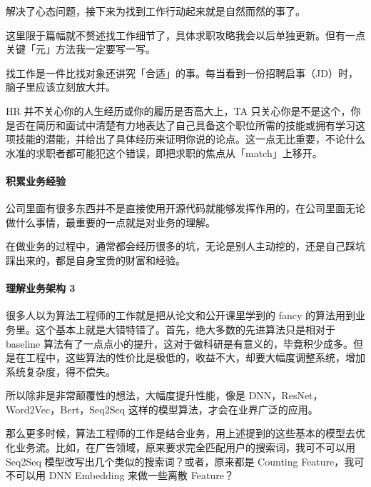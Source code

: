 \documentclass[letterpaper,11pt,english]{sphinxmanual}
\begin{document}
解决了心态问题，接下来为找到工作行动起来就是自然而然的事了。

这里限于篇幅就不赘述找工作细节了，具体求职攻略我会以后单独更新。但有一点关键「元」方法我一定要写一写。

找工作是一件比找对象还讲究「合适」的事。每当看到一份招聘启事（JD）时，脑子里应该立刻放大并。

HR 并不关心你的人生经历或你的履历是否高大上，TA
只关心你是不是这个，你是否在简历和面试中清楚有力地表达了自己具备这个职位所需的技能或拥有学习这项技能的潜能，并给出了具体经历来证明你说的论点。这一点无比重要，不论什么水准的求职者都可能犯这个错误，即把求职的焦点从「match」上移开。


\paragraph{积累业务经验}
\label{\detokenize{chapter_interview/xintai:id7}}
公司里面有很多东西并不是直接使用开源代码就能够发挥作用的，在公司里面无论做什么事情，最重要的一点就是对业务的理解。

在做业务的过程中，通常都会经历很多的坑，无论是别人主动挖的，还是自己踩坑踩出来的，都是自身宝贵的财富和经验。


\paragraph{理解业务架构 3\sphinxfootnotemark[753]}
\label{\detokenize{chapter_interview/xintai:id8}}%
\begin{footnotetext}[753]\sphinxAtStartFootnote
{}
%
\end{footnotetext}\ignorespaces 
很多人以为算法工程师的工作就是把从论文和公开课里学到的 fancy
的算法用到业务里。这个基本上就是大错特错了。首先，绝大多数的先进算法只是相对于
baseline
算法有了一点点小的提升，这对于做科研是有意义的，毕竟积少成多。但是在工程中，这些算法的性价比是极低的，收益不大，却要大幅度调整系统，增加系统复杂度，得不偿失。

所以除非是非常颠覆性的想法，大幅度提升性能，像是
DNN，ResNet，Word2Vec，Bert，Seq2Seq
这样的模型算法，才会在业界广泛的应用。

那么更多时候，算法工程师的工作是结合业务，用上述提到的这些基本的模型去优化业务流。比如，在广告领域，原来要求完全匹配用户的搜索词，我可不可以用
Seq2Seq 模型改写出几个类似的搜索词？或者，原来都是 Counting
Feature，我可不可以用 DNN Embedding 来做一些离散 Feature？
\end{document}
